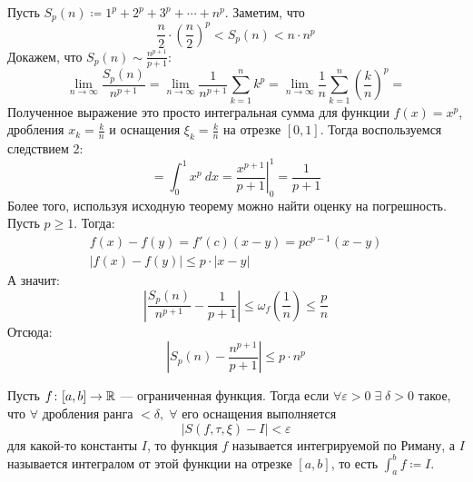 \begin{example}
  Пусть $S_p(n) \coloneqq 1^p + 2^p + 3^p + \dotsb + n^p$. Заметим, что
  \begin{equation*}
    \frac{n}{2} \cdot \left(\frac{n}{2} \right)^p < S_p(n) < n \cdot n^p
  \end{equation*}
  Докажем, что $S_p(n) \sim \frac{n^{p + 1}}{p + 1}$:
  \begin{equation*}
      \lim\limits_{n \to \infty} \frac{S_p(n)}{n^{p + 1}} =
      \lim\limits_{n \to \infty} \frac{1}{n^{p + 1}}\sum_{k = 1}^{n} k^p =
      \lim\limits_{n \to \infty} \frac{1}{n}\sum_{k = 1}^{n} \left(\frac{k}{n}\right)^p =
  \end{equation*}
  Полученное выражение это просто интегральная сумма для функции $f(x) = x^p$, дробления $x_k = \frac{k}{n}$ и оснащения $\xi_k = \frac{k}{n}$ на отрезке $[0, 1]$. Тогда воспользуемся следствием 2:
  \begin{equation*}
      = \int_{0}^{1} x^p \: dx = \left. \frac{x^{p + 1}}{p + 1} \right|_{0}^{1} = \frac{1}{p + 1}
  \end{equation*}
  Более того, используя исходную теорему можно найти оценку на погрешность. Пусть $p \geq 1$. Тогда:
  \begin{equation*}
    \begin{gathered}
      f(x) - f(y) = f'(c)(x - y) = pc^{p - 1}(x - y) \\
      | f(x) - f(y) | \leq p \cdot |x - y|
    \end{gathered}
  \end{equation*}
  А значит:
  \begin{equation*}
    \left |
      \frac{S_p(n)}{n^{p + 1}} - \frac{1}{p + 1}
    \right |
    \leq \omega_f\left(\frac{1}{n}\right) \leq \frac{p}{n}
  \end{equation*}
  Отсюда:
  \begin{equation*}
    \left |
      S_p(n) -
      \frac{n^{p + 1}}{p + 1}
    \right |
    \leq p \cdot n^p
  \end{equation*}
\end{example}

\begin{conj}
    Пусть $f\colon [a, b] \to \mathbb{R}$ --- ограниченная функция.
    Тогда если $\forall \varepsilon > 0 \; \exists \; \delta > 0$ такое, что $\forall$ дробления ранга $< \delta,\; \forall$ его оснащения выполняется
    \begin{equation*}
        | S(f, \tau, \xi) - I| < \varepsilon
    \end{equation*}
    для какой-то константы $I$, то функция $f$ называется интегрируемой по Риману, а $I$ называется интегралом от этой функции на отрезке $[a, b]$, то есть $\int_{a}^{b} f \coloneqq I$.
\end{conj}


